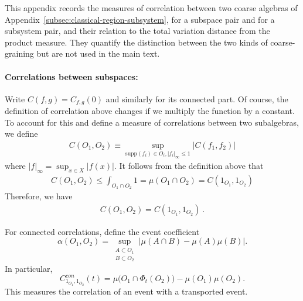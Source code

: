 \documentclass[a4paper,11pt]{article}
\theoremstyle{definition}
\begin{document}
This appendix records the measures of correlation between two coarse algebras of Appendix~\ref{subsec:classical-region-subsystem}, for a subspace pair and for a subsystem pair, and their relation to the total variation distance from the product measure. They quantify the distinction between the two kinds of coarse-graining but are not used in the main text.

\paragraph{Correlations between subspaces:} Write $C(f,g)=C_{f,g}(0)$ and similarly for its connected part. Of course, the definition of correlation above changes if we multiply the function by a constant. To account for this and define a measure of correlations between two subalgebras, we define
\begin{align}
    C(O_1,O_2)\equiv \sup_{\text{supp}(f_i)\in O_i,|f_i|_\infty\leq 1}|C(f_1,f_2)|
\end{align}
where $|f|_\infty=\sup_{x\in X}|f(x)|$. It follows from the definition above that
\begin{align}
    C(O_1,O_2)\leq \int_{O_1\cap O_2} 1=\mu(O_1\cap O_2)=C(1_{O_1},1_{O_2})
\end{align}
Therefore, we have
\begin{align}
    C(O_1,O_2)=C(1_{O_1},1_{O_2})\ .
\end{align}

For connected correlations, define the event coefficient
\begin{equation}
 \alpha(O_1,O_2)=
 \sup_{\substack{A\subset O_1\\B\subset O_2}}
 |\mu(A\cap B)-\mu(A)\mu(B)|.
\end{equation}
In particular,
\begin{equation}
 C^{con}_{1_{O_1},1_{O_2}}(t)
 =\mu\bigl(O_1\cap\Phi_t(O_2)\bigr)-\mu(O_1)\mu(O_2).
\end{equation}
This measures the correlation of an event with a transported event.
\end{document}
